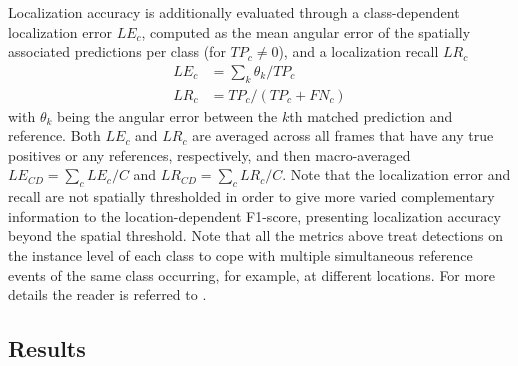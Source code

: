 \documentclass{article}
\begin{document}
\begin{sloppy}
Localization accuracy is additionally evaluated through a class-dependent localization error $LE_c$, computed as the mean angular error of the spatially associated predictions per class (for $TP_c\neq0$), and a localization recall $LR_c$
\begin{align}
    LE_c &= \sum_k \theta_k/TP_c\\
    LR_c &= TP_c/(TP_c + FN_c)
\end{align}
with $\theta_k$ being the angular error between the $k$th matched prediction and reference. Both $LE_c$ and $LR_c$ are averaged across all frames that have any true positives or any references, respectively, and then macro-averaged $LE_{CD} = \sum_c LE_c/C$ and $LR_{CD} = \sum_c LR_c/C$. Note that the localization error and recall are not spatially thresholded in order to give more varied complementary information to the location-dependent F1-score, presenting localization accuracy beyond the spatial threshold. Note that all the metrics above treat detections on the instance level of each class to cope with multiple simultaneous reference events of the same class occurring, for example, at different locations. For more details the reader is referred to \cite{politis2020overview}. 


\subsection{Results}
\label{sec:Results}


\end{sloppy}
\end{document}
